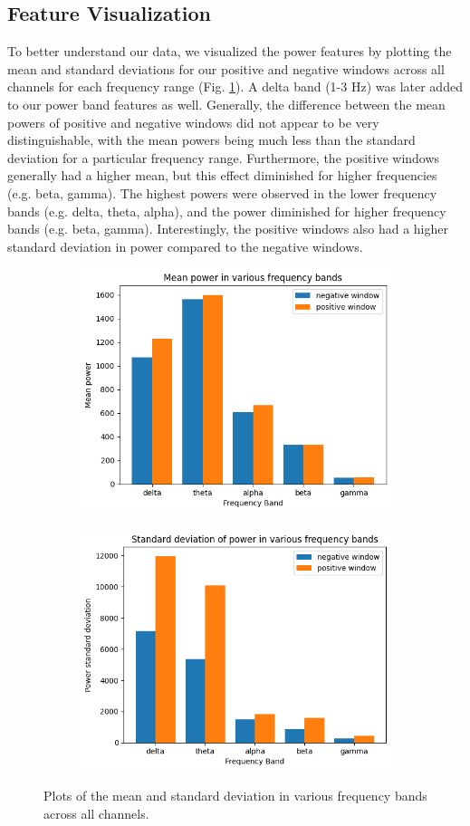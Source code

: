 \documentclass[format=sigconf, nonacm=true, review=false, screen=true]{acmart}
\begin{document}
\subsection{Feature Visualization}
To better understand our data, we visualized the power features by plotting the mean and standard deviations for our positive and negative windows across all channels for each frequency range (Fig. \ref{fig:barplot_mean_std_visualization}). A delta band (1-3 Hz) was later added to our power band features as well. Generally, the difference between the mean powers of positive and negative windows did not appear to be very distinguishable, with the mean powers being much less than the standard deviation for a particular frequency range. Furthermore, the positive windows generally had a higher mean, but this effect diminished for higher frequencies (e.g. beta, gamma). The highest powers were observed in the lower frequency bands (e.g. delta, theta, alpha), and the power diminished for higher frequency bands (e.g. beta, gamma). Interestingly, the positive windows also had a higher standard deviation in power compared to the negative windows.

\begin{figure}[H]
     \centering
     \begin{subfigure}
         \centering
         \includegraphics[width=0.48\columnwidth]{figures/bar-power-all-mean.png}
     \end{subfigure}
     \begin{subfigure}
         \centering
         \includegraphics[width=0.48\columnwidth]{figures/bar-power-all-stdev.png}
     \end{subfigure}
     \caption{Plots of the mean and standard deviation in various frequency bands across all channels.}
     \label{fig:barplot_mean_std_visualization}
\end{figure}
\end{document}
